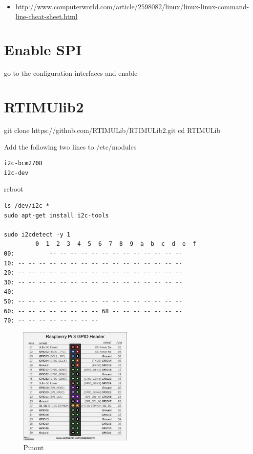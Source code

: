\begin{itemize}

\item
  \url{http://www.computerworld.com/article/2598082/linux/linux-linux-command-line-cheat-sheet.html}
\end{itemize}

\section{Enable SPI}\label{enable-spi}

go to the configuration interfaces and enable

\section{RTIMUlib2}\label{rtimulib2}

git clone https://github.com/RTIMULib/RTIMULib2.git cd RTIMULib

Add the following two lines to /etc/modules

\begin{verbatim}
i2c-bcm2708
i2c-dev
\end{verbatim}

reboot

\begin{verbatim}
ls /dev/i2c-*
sudo apt-get install i2c-tools

sudo i2cdetect -y 1
         0  1  2  3  4  5  6  7  8  9  a  b  c  d  e  f
00:          -- -- -- -- -- -- -- -- -- -- -- -- -- 
10: -- -- -- -- -- -- -- -- -- -- -- -- -- -- -- -- 
20: -- -- -- -- -- -- -- -- -- -- -- -- -- -- -- -- 
30: -- -- -- -- -- -- -- -- -- -- -- -- -- -- -- -- 
40: -- -- -- -- -- -- -- -- -- -- -- -- -- -- -- -- 
50: -- -- -- -- -- -- -- -- -- -- -- -- -- -- -- -- 
60: -- -- -- -- -- -- -- -- 68 -- -- -- -- -- -- -- 
70: -- -- -- -- -- -- -- --
\end{verbatim}

\begin{figure}[htb]
\centering
\includegraphics[width=0.5\textwidth]{images/rasp3.jpg}
\caption{Pinout}
\end{figure}

